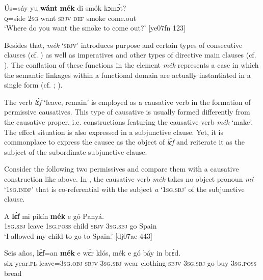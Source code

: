 \ea%
    \label{ex:key:1331}
    \gll \'{U}s=sáy  yu  \textbf{wánt}  \textbf{mék}    di  smók  kɔmɔ́t?\\
\textsc{q}=side  \textsc{2sg}  want  \textsc{sbjv}    \textsc{def}  smoke  come.out\\

\glt ‘Where do you want the smoke to come out?’ [ye07fn 123]
\z

Besides that, \textit{mék} ‘\textsc{sbjv}’ introduces purpose and certain types of consecutive clauses (cf. ) as well as imperatives and other types of directive main clauses (cf. ). The conflation of these functions in the element \textit{mék} represents a case in which the semantic linkages within a functional domain are actually instantiated in a single form (cf. \citealt[213–30]{PerkinsPagliuca1994}; \citealt[25–33]{Song2001}).


The verb \textit{lɛ́f} ‘leave, remain’ is employed as a causative verb in the formation of permissive causatives. This type of causative is usually formed differently from the causative proper, i.e. constructions featuring the causative verb \textit{mék} ‘make’. The effect situation is also expressed in a subjunctive clause. Yet, it is commonplace to express the causee as the object of \textit{lɛ́f} and reiterate it as the subject{\fff} of the subordinate subjunctive clause. 



Consider the following two permissives and compare them with a causative construction like  above. In , the causative verb \textit{mék} takes no object pronoun \textit{mí} ‘\textsc{1sg.indp}’ that is co-referential with the subject \textit{a} ‘\textsc{1sg.sbj’} of the subjunctive clause.



\ea%
    \label{ex:key:1332}
    \gll A    \textbf{lɛ́f}    mi    pikín  \textbf{mék}    e    gó  Panyá. \\
\textsc{1sg.sbj}  leave  \textsc{1sg.poss}  child  \textsc{sbjv}    \textsc{3sg.sbj}  go  Spain\\

\glt ‘I allowed my child to go to Spain.’ [dj07ae 443]
\z


\ea%
    \label{ex:key:1333}
    \gll Seis  años,  \textbf{lɛ́f}=an    \textbf{mék}    e    wɛ́r    klós,
mék    e    gó  báy  in    brɛ́d.\\
six  year.\textsc{pl}  leave=\textsc{3sg.obj}  \textsc{sbjv}    \textsc{3sg.sbj}  wear  clothing
\textsc{sbjv}    \textsc{3sg.sbj}  go  buy  \textsc{3sg.poss}  bread\\


